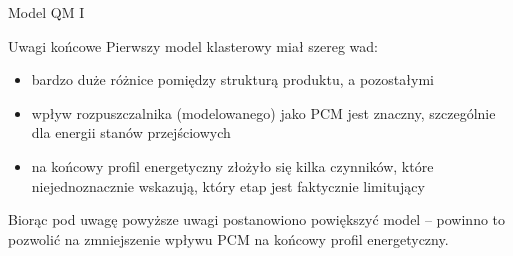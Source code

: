 \begin{section}{Model QM I}
\begin{subsection}{Uwagi końcowe}
 Pierwszy model klasterowy miał szereg wad:
 \begin{itemize}
  \item bardzo duże różnice pomiędzy strukturą produktu, a pozostałymi
  \item wpływ rozpuszczalnika (modelowanego) jako PCM jest znaczny, szczególnie dla energii stanów przejściowych
  \item na końcowy profil energetyczny złożyło się kilka czynników, które niejednoznacznie wskazują, który etap jest faktycznie limitujący
 \end{itemize}
 
 Biorąc pod uwagę powyższe uwagi postanowiono powiększyć model -- powinno to pozwolić na zmniejszenie wpływu PCM na końcowy profil energetyczny.

  \end{subsection}
 
\end{section}